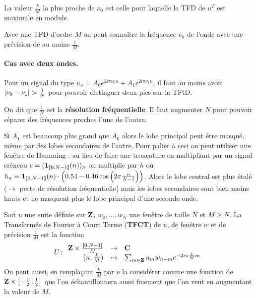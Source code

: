 \begin{thm}
	La valeur $\frac{k}{M}$ la plus proche de $\nu_0$ est celle pour laquelle la TFD de $u^T$ est maximale en module.
\end{thm}

\begin{pop}
	Avec une TFD d'ordre $M$ on peut connaître la fréquence $\nu_0$ de l'onde avec une précision de au moins $\frac{1}{M}$.
\end{pop}

\paragraph{Cas avec deux ondes.}
Pour un signal du type $u_n = A_0 e^{2i\pi \nu_0 n} + A_1 e^{2i\pi \nu_1 n}$, il faut au moins avoir $\left\lvert\nu_0 - \nu_1\right\rvert > \frac{1}{N}$ pour pouvoir distinguer deux pics sur la TFtD.

\begin{voc}
	On dit que $\frac{1}{N}$ est la \textbf{résolution fréquentielle}.
	Il faut augmenter $N$ pour pouvoir séparer des fréquences proches l'une de l'autre.
\end{voc}

Si $A_1$ est beaucoup plus grand que $A_0$ alors le lobe principal peut être masqué, même par des lobes secondaires de l'autre.
Pour palier à ceci on peut utiliser une fenêtre de Hamming : au lieu de faire une troncature en multipliant par un signal créneau $c = (\operatorname{\mathbf{1}}_{\mathopen{}\mathclose{\left[\![0\mathclose{}\mathpunct{};N - 1\right]\!]}}(n))_n$ on multiplie par $h$ où $h_n = \operatorname{\mathbf{1}}_{\mathopen{}\mathclose{\left[\![0\mathclose{}\mathpunct{};N - 1\right]\!]}}(n) \cdot \left( 0.54 - 0.46 \cos \left( 2\pi \frac{n}{N - 1} \right) \right)$.
Alors le lobe central est plus étalé ($\rightarrow$ perte de résolution fréquentielle) mais les lobes secondaires sont bien moins hauts et ne masquent plus le lobe principal d'une seconde onde.

\begin{defn}
	Soit $u$ une suite définie sur $\mathbf{Z}$, $w_0,\ldots,w_N$ une fenêtre de taille $N$ et $M \geq N$.
	La Transformée de Fourier à Court Terme (\textbf{TFCT}) de $u$, de fenêtre $w$ et de précision $\frac{1}{M}$ est la fonction
	$$U \colon \begin{array}{rcl}
		\mathbf{Z} \times \frac{\mathopen{}\mathclose{\left[\![0\mathclose{}\mathpunct{};N - 1\right]\!]}}{M} & \to & \mathbf{C} \\
		\left( n, \frac{k}{M} \right) & \mapsto & \sum_{m \in \mathbf{Z}} u_m w_{n - m} e^{-2i\pi \frac{k}{M} m}
	\end{array}$$
	On peut aussi, en remplaçant $\frac{k}{M}$ par $\nu$ la considérer comme une fonction de $\mathbf{Z} \times \mathopen{}\mathclose{\left[-\frac{1}{2}\mathclose{}\mathpunct{};\frac{1}{2}\right]}$ que l'on échantillonnera aussi finement que l'on veut en augmentant la valeur de $M$.
\end{defn}

